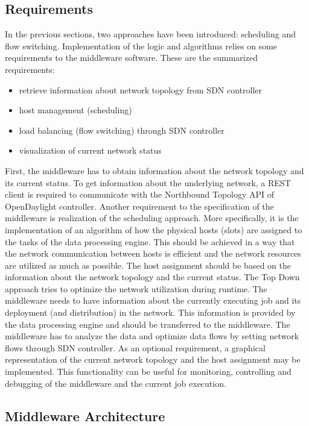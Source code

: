 \subsection{Requirements}
In the previous sections, two approaches have been introduced: scheduling and flow switching.
Implementation of the logic and algorithms relies on some requirements to the middleware software.
These are the summarized requirements:
\begin{itemize}
	\item retrieve information about network topology from SDN controller
	\item host management (scheduling)
	\item load balancing (flow switching) through SDN controller
	\item visualization of current network status
\end{itemize}
First, the middleware has to obtain information about the network topology and its current status.
To get information about the underlying network, a REST client is required to communicate with the
Northbound Topology API of OpenDaylight controller. Another requirement to the specification of the
middleware is realization of the scheduling approach. More specifically, it is the implementation of an
algorithm of how the physical hosts (slots) are assigned to the tasks of the data processing engine.
This should be achieved in a way that the network communication between hosts is efficient and the
network resources are utilized as much as possible. The host assignment should be based on the
information about the network topology and the current status. The Top Down approach tries to
optimize the network utilization during runtime. The middleware needs to have information about the
currently executing job and its deployment (and distribution) in the network. This information is
provided by the data processing engine and should be transferred to the middleware. The middleware
has to analyze the data and optimize data flows by setting network flows through SDN controller. As
an optional requirement, a graphical representation of the current network topology and the host
assignment may be implemented. This functionality can be useful for monitoring, controlling and
debugging of the middleware and the current job execution.

\subsection{Middleware Architecture}

